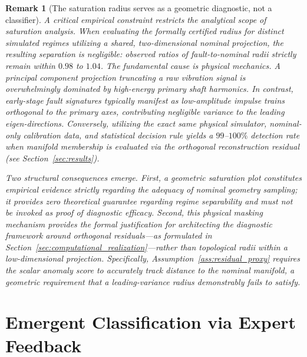 \documentclass[a4paper]{cas-sc}
\newtheorem{remark}{Remark}
\begin{document}
\begin{remark}[The saturation radius serves as a geometric diagnostic, not a classifier]
\label{rem:radius_not_detector}
A critical empirical constraint restricts the analytical scope of saturation analysis. When evaluating the formally certified radius for distinct simulated regimes utilizing a shared, two-dimensional nominal projection, the resulting separation is negligible: observed ratios of fault-to-nominal radii strictly remain within \(0.98\) to \(1.04\). The fundamental cause is physical mechanics. A principal component projection truncating a raw vibration signal is overwhelmingly dominated by high-energy primary shaft harmonics. In contrast, early-stage fault signatures typically manifest as low-amplitude impulse trains orthogonal to the primary axes, contributing negligible variance to the leading eigen-directions. Conversely, utilizing the exact same physical simulator, nominal-only calibration data, and statistical decision rule yields a \(99\)--\(100\%\) detection rate when manifold membership is evaluated via the orthogonal reconstruction residual (see Section~\ref{sec:results}).

Two structural consequences emerge. First, a geometric saturation plot constitutes empirical evidence strictly regarding the adequacy of nominal geometry sampling; it provides zero theoretical guarantee regarding regime separability and must not be invoked as proof of diagnostic efficacy. Second, this physical masking mechanism provides the formal justification for architecting the diagnostic framework around orthogonal residuals---as formulated in Section~\ref{sec:computational_realization}---rather than topological radii within a low-dimensional projection. Specifically, Assumption~\ref{ass:residual_proxy} requires the scalar anomaly score to accurately track distance to the nominal manifold, a geometric requirement that a leading-variance radius demonstrably fails to satisfy.
\end{remark}

\section{Emergent Classification via Expert Feedback}
\label{sec:emergent_classification}
\end{document}
